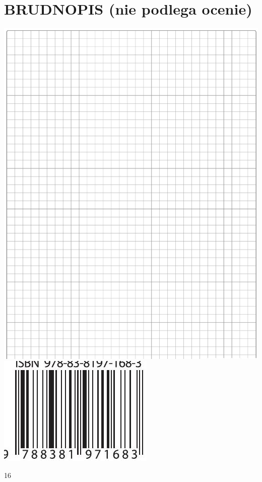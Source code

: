 \documentclass[10pt]{article}
\begin{document}
\section*{BRUDNOPIS (nie podlega ocenie)}
\includegraphics[max width=\textwidth, center]{2024_11_21_e30d1f37bf0e3631c088g-16(1)}\\
\includegraphics[max width=\textwidth, center]{2024_11_21_e30d1f37bf0e3631c088g-16}

16
\end{document}
